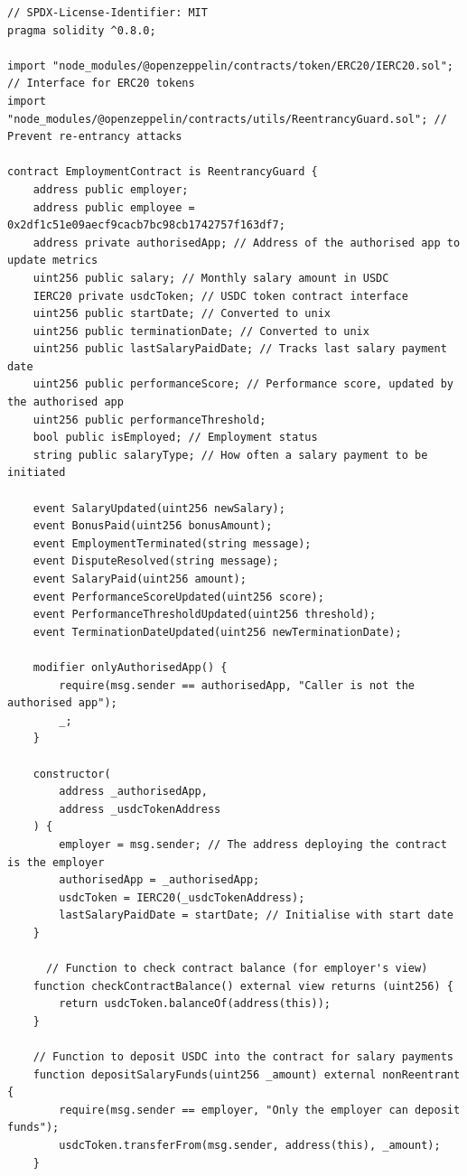 \begin{lstlisting}[caption=General Purpose Smart Contract]
// SPDX-License-Identifier: MIT
pragma solidity ^0.8.0;

import "node_modules/@openzeppelin/contracts/token/ERC20/IERC20.sol"; // Interface for ERC20 tokens
import "node_modules/@openzeppelin/contracts/utils/ReentrancyGuard.sol"; // Prevent re-entrancy attacks

contract EmploymentContract is ReentrancyGuard {
    address public employer;
    address public employee = 0x2df1c51e09aecf9cacb7bc98cb1742757f163df7;
    address private authorisedApp; // Address of the authorised app to update metrics
    uint256 public salary; // Monthly salary amount in USDC
    IERC20 private usdcToken; // USDC token contract interface
    uint256 public startDate; // Converted to unix
    uint256 public terminationDate; // Converted to unix
    uint256 public lastSalaryPaidDate; // Tracks last salary payment date
    uint256 public performanceScore; // Performance score, updated by the authorised app
    uint256 public performanceThreshold;
    bool public isEmployed; // Employment status
    string public salaryType; // How often a salary payment to be initiated

    event SalaryUpdated(uint256 newSalary);
    event BonusPaid(uint256 bonusAmount);
    event EmploymentTerminated(string message);
    event DisputeResolved(string message);
    event SalaryPaid(uint256 amount);
    event PerformanceScoreUpdated(uint256 score);
    event PerformanceThresholdUpdated(uint256 threshold);
    event TerminationDateUpdated(uint256 newTerminationDate);

    modifier onlyAuthorisedApp() {
        require(msg.sender == authorisedApp, "Caller is not the authorised app");
        _;
    }

    constructor(
        address _authorisedApp,
        address _usdcTokenAddress
    ) {
        employer = msg.sender; // The address deploying the contract is the employer
        authorisedApp = _authorisedApp;
        usdcToken = IERC20(_usdcTokenAddress);
        lastSalaryPaidDate = startDate; // Initialise with start date
    }

      // Function to check contract balance (for employer's view)
    function checkContractBalance() external view returns (uint256) {
        return usdcToken.balanceOf(address(this));
    }

    // Function to deposit USDC into the contract for salary payments
    function depositSalaryFunds(uint256 _amount) external nonReentrant {
        require(msg.sender == employer, "Only the employer can deposit funds");
        usdcToken.transferFrom(msg.sender, address(this), _amount);
    }


\end{lstlisting}

